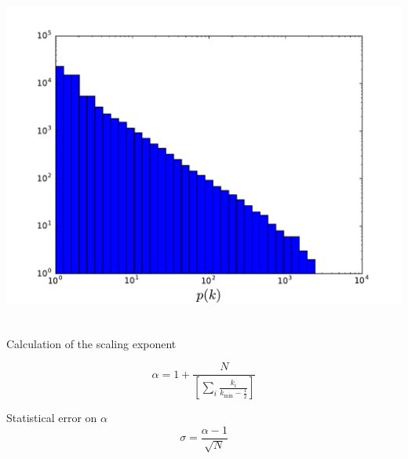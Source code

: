 \documentclass{beamer}
\begin{document}
\begin{frame}
\begin{columns}
        \includegraphics[width=\columnwidth]{internet_loglog_logbin_cum_hist.pdf}
    \end{columns}
\end{frame}
\begin{frame}
    \frametitle{}
    Calculation of the scaling exponent
    
    \centering
    $$\alpha = 1 + \frac{N}{\left[\sum\limits_i\frac{k_i}{k_{\text{min}}-\frac{1}{2}}\right]}$$

    \justifying
    Statistical error on $\alpha$
    $$\sigma = \frac{\alpha-1}{\sqrt{N}}$$
\end{frame}
\end{document}

